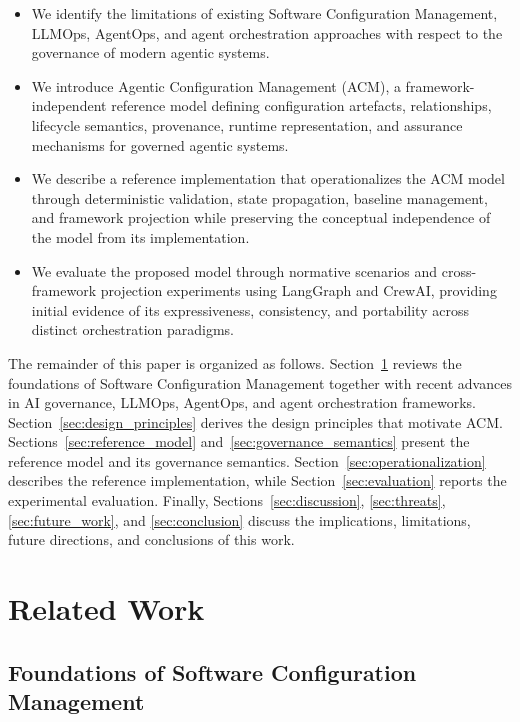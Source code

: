 \documentclass[10pt]{article}
\begin{document}
\begin{itemize}
    \item We identify the limitations of existing Software Configuration Management, LLMOps, AgentOps, and agent orchestration approaches with respect to the governance of modern agentic systems.
    
    \item We introduce Agentic Configuration Management (ACM), a framework-independent reference model defining configuration artefacts, relationships, lifecycle semantics, provenance, runtime representation, and assurance mechanisms for governed agentic systems.
    
    \item We describe a reference implementation that operationalizes the ACM model through deterministic validation, state propagation, baseline management, and framework projection while preserving the conceptual independence of the model from its implementation.
    
    \item We evaluate the proposed model through normative scenarios and cross-framework projection experiments using LangGraph and CrewAI, providing initial evidence of its expressiveness, consistency, and portability across distinct orchestration paradigms.
\end{itemize}

The remainder of this paper is organized as follows. Section~\ref{sec:related_work} reviews the foundations of Software Configuration Management together with recent advances in AI governance, LLMOps, AgentOps, and agent orchestration frameworks. Section~\ref{sec:design_principles} derives the design principles that motivate ACM. Sections~\ref{sec:reference_model} and~\ref{sec:governance_semantics} present the reference model and its governance semantics. Section~\ref{sec:operationalization} describes the reference implementation, while Section~\ref{sec:evaluation} reports the experimental evaluation. Finally, Sections~\ref{sec:discussion}, \ref{sec:threats}, \ref{sec:future_work}, and \ref{sec:conclusion} discuss the implications, limitations, future directions, and conclusions of this work.


\section{Related Work}
\label{sec:related_work}

\subsection{Foundations of Software Configuration Management}
\label{sec:scm_foundations}
\end{document}
